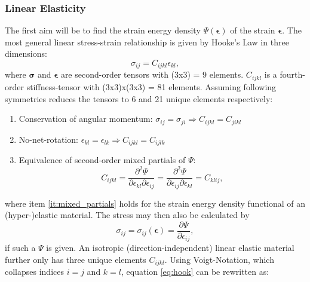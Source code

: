 \documentclass[m,times]{cgMA}
\begin{document}
\subsubsection{Linear Elasticity}\label{sec:linear_elasticty}
The first aim will be to find the strain energy density $\Psi(\boldsymbol{\epsilon})$ of the strain $\bm{\epsilon}$. The most general linear stress-strain relationship is given by Hooke's Law in three dimensions:
\begin{equation}\label{eq:hook}
  \sigma_{ij} = C_{ijkl} \epsilon_{kl},
\end{equation}
where $\boldsymbol{\sigma}$ and $\bm{\epsilon}$ are second-order tensors with (3x3) = 9 elements. $C_{ijkl}$ is a fourth-order stiffness-tensor with (3x3)x(3x3) = 81 elements.
Assuming following symmetries reduces the tensors to 6 and 21 unique elements respectively:
\begin{enumerate}
  \item Conservation of angular momentum: $\sigma_{ij} = \sigma_{ji} \Rightarrow C_{ijkl} = C_{jikl} $
  \item No-net-rotation: $\epsilon_{kl} = \epsilon_{lk} \Rightarrow C_{ijkl} = C_{ijlk}$
  \item \label{it:mixed_partials}Equivalence of second-order mixed partials of $\Psi$:
    \begin{equation}
      C _ { i j k l } = \frac { \partial ^ { 2 } { \Psi } } { \partial \epsilon _ { k l } \partial \epsilon _ { i j } } = \frac { \partial ^ { 2 } { \Psi } } { \partial \epsilon _ { i j } \partial \epsilon _ { k l } } = C _ { k l i j },
    \end{equation}
\end{enumerate}
where item \ref{it:mixed_partials} holds for the strain energy density functional of an (hyper-)elastic material. The stress may then also be calculated by
\begin{equation}\label{eq:partial_energy}
  \sigma _ { i j } = \sigma _ { i j } ( \boldsymbol{\epsilon} ) = \frac { \partial { \Psi } } { \partial \epsilon _ { i j } },
\end{equation}
if such a $\Psi$ is given. An isotropic (direction-independent) linear elastic material further only has three unique elements $C _ {i j k l}$. Using Voigt-Notation, which collapses indices $i=j$ and $k=l$, equation \ref{eq:hook} can be rewritten as:
\end{document}
